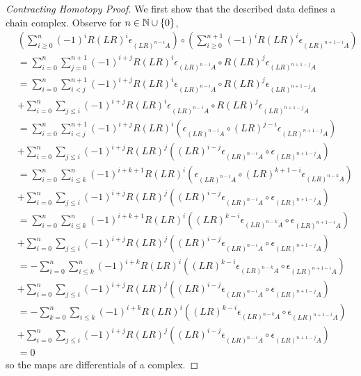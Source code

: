 \begin{proof}[Contracting Homotopy Proof]
    We first show that the described data defines a chain complex. Observe for $n \in \mathbb N\cup\{0\}$,
    \begin{align*}
        &\left(\sum_{i\geq 0}^{n}(-1)^iR(LR)^i\epsilon_{(LR)^{n-i}A}\right)\circ\left(\sum_{i\geq 0}^{n+1}(-1)^iR(LR)^i\epsilon_{(LR)^{n+1-i}A}\right) \\
        &= \sum_{i=0}^n\sum_{j=0}^{n+1}(-1)^{i+j}R(LR)^i\epsilon_{(LR)^{n-i}A}\circ R(LR)^j\epsilon_{(LR)^{n+1-j}A} \\
        &= \sum_{i=0}^n\sum_{i < j}^{n+1}(-1)^{i+j}R(LR)^i\epsilon_{(LR)^{n-i}A}\circ R(LR)^j\epsilon_{(LR)^{n+1-j}A} \\
        &+\sum_{i=0}^n\sum_{j \leq i}(-1)^{i+j}R(LR)^i\epsilon_{(LR)^{n-i}A}\circ R(LR)^j\epsilon_{(LR)^{n+1-j}A} \\
        &= \sum_{i=0}^n\sum_{i < j}^{n+1}(-1)^{i+j}R(LR)^i(\epsilon_{(LR)^{n-i}A}\circ (LR)^{j-i}\epsilon_{(LR)^{n+1-j}A}) \\
        &+\sum_{i=0}^n\sum_{j \leq i}(-1)^{i+j}R(LR)^j((LR)^{i-j}\epsilon_{(LR)^{n-i}A}\circ \epsilon_{(LR)^{n+1-j}A}) \\
        &= \sum_{i=0}^n\sum_{i \leq k}^{n}(-1)^{i+k+1}R(LR)^i(\epsilon_{(LR)^{n-i}A}\circ (LR)^{k+1-i}\epsilon_{(LR)^{n-k}A}) \tag{substituting $k = j-1$} \\
        &+\sum_{i=0}^n\sum_{j \leq i}(-1)^{i+j}R(LR)^j((LR)^{i-j}\epsilon_{(LR)^{n-i}A}\circ \epsilon_{(LR)^{n+1-j}A}) \\
        &= \sum_{i=0}^n\sum_{i \leq k}^{n}(-1)^{i+k+1}R(LR)^i((LR)^{k-i}\epsilon_{(LR)^{n-k}A}\circ \epsilon_{(LR)^{n+1-i}A}) \tag{by naturality of $\epsilon$} \\
        &+\sum_{i=0}^n\sum_{j \leq i}(-1)^{i+j}R(LR)^j((LR)^{i-j}\epsilon_{(LR)^{n-i}A}\circ \epsilon_{(LR)^{n+1-j}A}) \\
        &= -\sum_{i=0}^n\sum_{i \leq k}^{n}(-1)^{i+k}R(LR)^i((LR)^{k-i}\epsilon_{(LR)^{n-k}A}\circ \epsilon_{(LR)^{n+1-i}A}) \\
        &+\sum_{i=0}^n\sum_{j \leq i}(-1)^{i+j}R(LR)^j((LR)^{i-j}\epsilon_{(LR)^{n-i}A}\circ \epsilon_{(LR)^{n+1-j}A}) \\
        &= -\sum_{k=0}^n\sum_{i \leq k}(-1)^{i+k}R(LR)^i((LR)^{k-i}\epsilon_{(LR)^{n-k}A}\circ \epsilon_{(LR)^{n+1-i}A}) \tag{switching the order of summation} \\
        &+\sum_{i=0}^n\sum_{j \leq i}(-1)^{i+j}R(LR)^j((LR)^{i-j}\epsilon_{(LR)^{n-i}A}\circ \epsilon_{(LR)^{n+1-j}A}) \\
        &= 0
    \end{align*}
    so the maps are differentials of a complex.


\end{proof}
